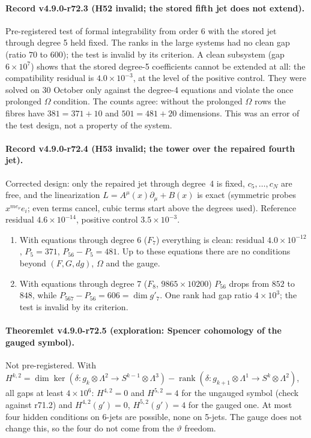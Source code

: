\paragraph{Record v4.9.0-r72.3 (H52 invalid; the stored fifth jet does not extend).}
Pre-registered test of formal integrability from order 6 with the stored jet through degree 5 held fixed.  The ranks in the
large systems had no clean gap (ratio \(70\) to \(600\)); the test is invalid by its criterion.  A clean subsystem (gap
\(6\times10^7\)) shows that the stored degree-5 coefficients cannot be extended at all: the compatibility residual is
\(4.0\times10^{-3}\), at the level of the positive control.  They were solved on 30 October only against the degree-4
equations and violate the once prolonged \(\Omega\) condition.  The counts agree: without the prolonged \(\Omega\) rows the
fibres have \(381=371+10\) and \(501=481+20\) dimensions.  This was an error of the test design, not a property of the system.

\paragraph{Record v4.9.0-r72.4 (H53 invalid; the tower over the repaired fourth jet).}
Corrected design: only the repaired jet through degree~4 is fixed, \(c_5,\dots,c_N\) are free, and the linearization
\(L=A^\mu(x)\partial_\mu+B(x)\) is exact (symmetric probes \(x^{m e_\nu}e_i\); even terms cancel, cubic terms start above the
degrees used).  Reference residual \(4.6\times10^{-14}\), positive control \(3.5\times10^{-3}\).
\begin{enumerate}[leftmargin=2em]
\item[(a)] With equations through degree 6 (\(F_7\)) everything is clean: residual \(4.0\times10^{-12}\), \(P_5=371\),
\(P_{56}-P_5=481\).  Up to these equations there are no conditions beyond \((F,G,dg)\), \(\Omega\) and the gauge.
\item[(b)] With equations through degree 7 (\(F_8\), \(9865\times10200\)) \(P_{56}\) drops from \(852\) to \(848\), while
\(P_{567}-P_{56}=606=\dim g'_7\).  One rank had gap ratio \(4\times10^3\); the test is invalid by its criterion.
\end{enumerate}

\paragraph{Theoremlet v4.9.0-r72.5 (exploration: Spencer cohomology of the gauged symbol).}
Not pre-registered.  With \(H^{k,2}=\dim\ker(\delta:g_k\otimes\Lambda^2\to S^{k-1}\otimes\Lambda^3)-\operatorname{rank}(\delta:g_{k+1}\otimes\Lambda^1\to S^k\otimes\Lambda^2)\),
all gaps at least \(4\times10^6\): \(H^{4,2}=0\) and \(H^{5,2}=4\) for the ungauged symbol (check against r71.2) and
\(H^{4,2}(g')=0\), \(H^{5,2}(g')=4\) for the gauged one.  At most four hidden conditions on 6-jets are possible, none on 5-jets.
The gauge does not change this, so the four do not come from the \(\vartheta\) freedom.

